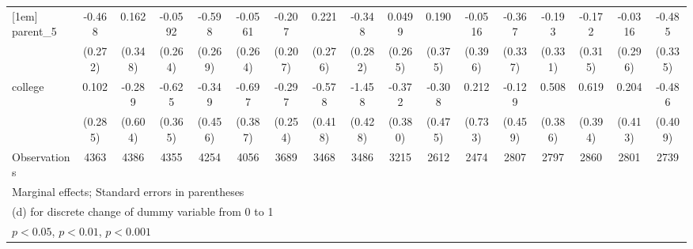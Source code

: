 {\begin{tabular}{l*{16}{c}}
[1em]
parent\_5            &      -0.468         &       0.162         &     -0.0592         &      -0.598\sym{*}  &     -0.0561         &      -0.207         &       0.221         &      -0.348         &      0.0499         &       0.190         &     -0.0516         &      -0.367         &      -0.193         &      -0.172         &     -0.0316         &      -0.485         \\
                    &     (0.272)         &     (0.348)         &     (0.264)         &     (0.269)         &     (0.264)         &     (0.207)         &     (0.276)         &     (0.282)         &     (0.265)         &     (0.375)         &     (0.396)         &     (0.337)         &     (0.331)         &     (0.315)         &     (0.296)         &     (0.335)         \\
[1em]
college             &       0.102         &      -0.289         &      -0.625         &      -0.349         &      -0.697         &      -0.297         &      -0.578         &      -1.458\sym{***}&      -0.372         &      -0.308         &       0.212         &      -0.129         &       0.508         &       0.619         &       0.204         &      -0.486         \\
                    &     (0.285)         &     (0.604)         &     (0.365)         &     (0.456)         &     (0.387)         &     (0.254)         &     (0.418)         &     (0.428)         &     (0.380)         &     (0.475)         &     (0.733)         &     (0.459)         &     (0.386)         &     (0.394)         &     (0.413)         &     (0.409)         \\
\hline
Observations        &        4363         &        4386         &        4355         &        4254         &        4056         &        3689         &        3468         &        3486         &        3215         &        2612         &        2474         &        2807         &        2797         &        2860         &        2801         &        2739         \\
\hline\hline
\multicolumn{17}{l}{\footnotesize Marginal effects; Standard errors in parentheses}\\
\multicolumn{17}{l}{\footnotesize  (d) for discrete change of dummy variable from 0 to 1}\\
\multicolumn{17}{l}{\footnotesize \sym{*} \(p<0.05\), \sym{**} \(p<0.01\), \sym{***} \(p<0.001\)}\\
\end{tabular}
}
